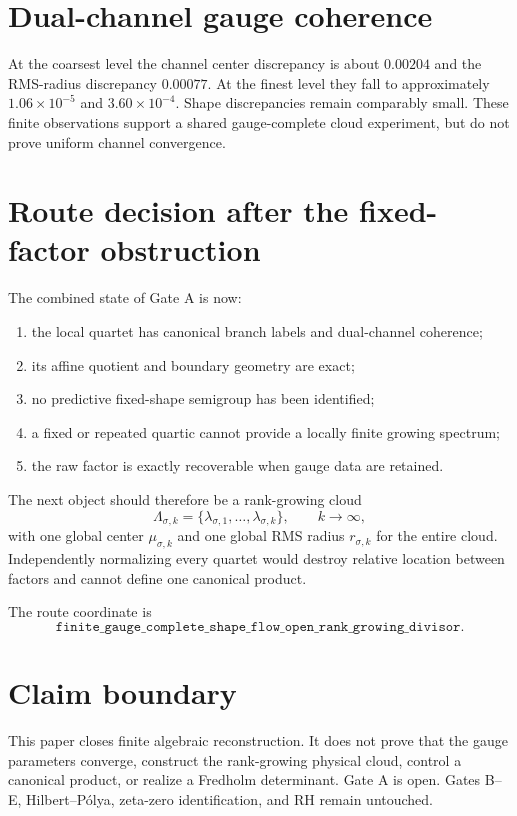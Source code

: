 \documentclass[12pt]{article}
\theoremstyle{remark}\newtheorem{remark}[theorem]{Remark}
\begin{document}
\section{Dual-channel gauge coherence}

At the coarsest level the channel center discrepancy is about $0.00204$ and
the RMS-radius discrepancy $0.00077$.  At the finest level they fall to
approximately $1.06\times10^{-5}$ and $3.60\times10^{-4}$.  Shape
discrepancies remain comparably small.  These finite observations support a
shared gauge-complete cloud experiment, but do not prove uniform channel
convergence.

\section{Route decision after the fixed-factor obstruction}

The combined state of Gate A is now:
\begin{enumerate}[leftmargin=2em]
\item the local quartet has canonical branch labels and dual-channel
coherence;
\item its affine quotient and boundary geometry are exact;
\item no predictive fixed-shape semigroup has been identified;
\item a fixed or repeated quartic cannot provide a locally finite growing
spectrum;
\item the raw factor is exactly recoverable when gauge data are retained.
\end{enumerate}

The next object should therefore be a rank-growing cloud
\begin{equation}
 \Lambda_{\sigma,k}=\{\lambda_{\sigma,1},\ldots,\lambda_{\sigma,k}\},
 \qquad k\to\infty,
\end{equation}
with one global center $\mu_{\sigma,k}$ and one global RMS radius
$r_{\sigma,k}$ for the entire cloud.  Independently normalizing every quartet
would destroy relative location between factors and cannot define one
canonical product.

The route coordinate is
\begin{equation*}
 \boxed{\texttt{finite\_gauge\_complete\_shape\_flow\_open\_rank\_growing\_divisor}}.
\end{equation*}

\section{Claim boundary}

This paper closes finite algebraic reconstruction.  It does not prove that
the gauge parameters converge, construct the rank-growing physical cloud,
control a canonical product, or realize a Fredholm determinant.  Gate A is
open.  Gates B--E, Hilbert--P\'olya, zeta-zero identification, and RH remain
untouched.


\end{document}
